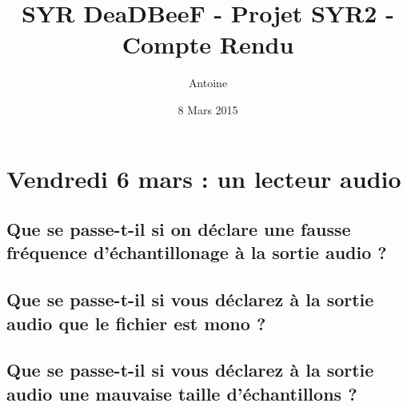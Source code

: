 \documentclass[a4paper,10pt,openany,oneside]{report}
\title{SYR DeaDBeeF - Projet SYR2 - Compte Rendu}
\author{Antoine \bsc{Pinsard}}
\date{8 Mars 2015}
\begin{document}
\maketitle

\section{Vendredi 6 mars : un lecteur audio}

\subsection{Que se passe-t-il si on déclare une fausse fréquence d'échantillonage à la sortie audio ?}

\subsection{Que se passe-t-il si vous déclarez à la sortie audio que le fichier est mono ?}

\subsection{Que se passe-t-il si vous déclarez à la sortie audio une mauvaise taille d'échantillons ?}
\end{document}
